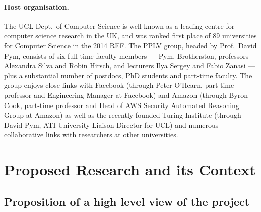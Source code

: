\documentclass[11pt,twocolumn]{article}
\begin{document}
\paragraph{Host organisation.}
The UCL Dept.\ of Computer Science is well known as a leading centre for computer science research in the UK, and was ranked first place of 89 universities for Computer Science in the 2014 REF. The PPLV group, headed by Prof.\ David Pym, consists of six full-time faculty members --- Pym, Brotherston, professors Alexandra Silva and Robin Hirsch, and lecturers Ilya Sergey and Fabio Zanasi --- plus a substantial number of postdocs, PhD students and part-time faculty. The group enjoys close links with Facebook (through Peter O'Hearn, part-time professor and Engineering Manager at Facebook) and Amazon (through Byron Cook, part-time professor and Head of AWS Security Automated Reasoning Group at Amazon) as well as the recently founded Turing Institute (through David Pym, ATI University Liaison Director for UCL) and numerous collaborative links with researchers at other universities.

\begingroup
\footnotesize
{}
\endgroup


%

\newpage

\section{Proposed Research and its Context}

\subsection{Proposition of a high level view of the project}
\end{document}
